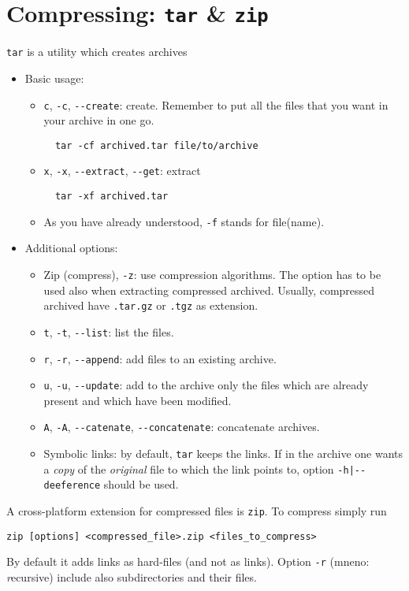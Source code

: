 \documentclass[a4paper,12pt,%
              final%
              ]{article}
\begin{document}
\section{Compressing: \texttt{tar} \& \texttt{zip}}
\texttt{tar} is a utility which creates archives
\begin{itemize}
  \item Basic usage:
    \begin{itemize}
      \item \verb|c|, \verb|-c|, \verb|--create|: create. Remember to put all the files that you want in your archive in one go.
\begin{verbatim}
  tar -cf archived.tar file/to/archive
\end{verbatim}
      \item \verb|x|, \verb|-x|, \verb|--extract|, \verb|--get|: extract
\begin{verbatim}
  tar -xf archived.tar
\end{verbatim}
      \item As you have already understood, \verb|-f| stands for file(name).
    \end{itemize}
  \item Additional options:
    \begin{itemize}
      \item Zip (compress), \verb|-z|: use compression algorithms. The option has to be used also when extracting compressed archived. Usually, compressed archived have \verb|.tar.gz| or \verb|.tgz| as extension. 
      \item \verb|t|, \verb|-t|, \verb|--list|: list the files.
      \item \verb|r|, \verb|-r|, \verb|--append|: add files to an existing archive.
      \item \verb|u|, \verb|-u|, \verb|--update|: add to the archive only the files which are already present and which have been modified.
      \item \verb|A|, \verb|-A|, \verb|--catenate|, \verb|--concatenate|: concatenate archives.
      \item Symbolic links: by default, \texttt{tar} keeps the links. If in the archive one wants a \emph{copy} of the \emph{original} file to which the link points to, option \verb!-h|--deeference! should be used.
    \end{itemize}
\end{itemize}

\medskip
A cross-platform extension for compressed files is \texttt{zip}. To compress simply run
\begin{verbatim}
zip [options] <compressed_file>.zip <files_to_compress>
\end{verbatim}
By default it adds links as hard-files (and not as links). Option \verb|-r| (mneno: \emph{r}ecursive) include also {sub}directories and their files.
\end{document}
